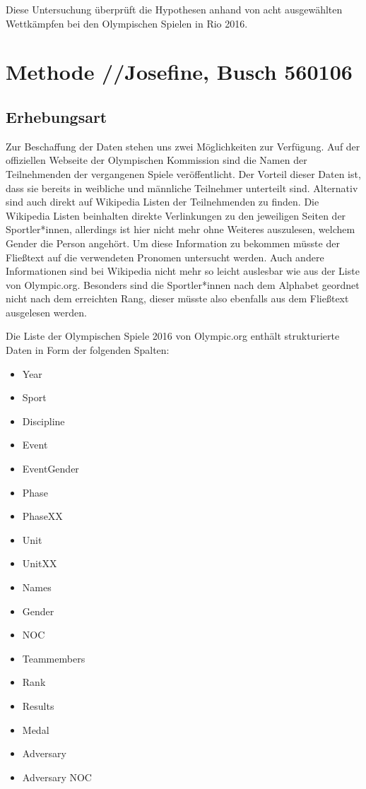\documentclass[11pt]{article}
\begin{document}
Diese Untersuchung überprüft die Hypothesen anhand von acht ausgewählten Wettkämpfen bei den Olympischen Spielen in Rio 2016.

\section*{Methode //Josefine, Busch 560106}
\label{igw}

\subsection*{Erhebungsart}
Zur Beschaffung der Daten stehen uns zwei Möglichkeiten zur Verfügung. Auf der offiziellen Webseite der Olympischen Kommission sind die Namen der Teilnehmenden der vergangenen Spiele veröffentlicht.\cite{olympicResults} Der Vorteil dieser Daten ist, dass sie bereits in weibliche und männliche Teilnehmer unterteilt sind. Alternativ sind auch direkt auf Wikipedia Listen der Teilnehmenden zu finden. \cite{wikiOlympicComp} Die Wikipedia Listen beinhalten direkte Verlinkungen zu den jeweiligen Seiten der Sportler*innen, allerdings ist hier nicht mehr ohne Weiteres auszulesen, welchem Gender die Person angehört. Um diese Information zu bekommen müsste der Fließtext auf die verwendeten Pronomen untersucht werden. Auch andere Informationen sind bei Wikipedia nicht mehr so leicht auslesbar wie aus der Liste von Olympic.org. Besonders sind die Sportler*innen nach dem Alphabet geordnet nicht nach dem erreichten Rang, dieser müsste also ebenfalls aus dem Fließtext ausgelesen werden.

Die Liste der Olympischen Spiele 2016 von Olympic.org enthält strukturierte Daten in Form der folgenden Spalten:

\begin{itemize}
\item Year 
\item Sport
\item Discipline
\item Event
\item EventGender
\item Phase
\item PhaseXX
\item Unit
\item UnitXX
\item Names
\item Gender
\item NOC
\item Teammembers
\item Rank
\item Results
\item Medal
\item Adversary
\item Adversary NOC
\end{itemize}
\end{document}
